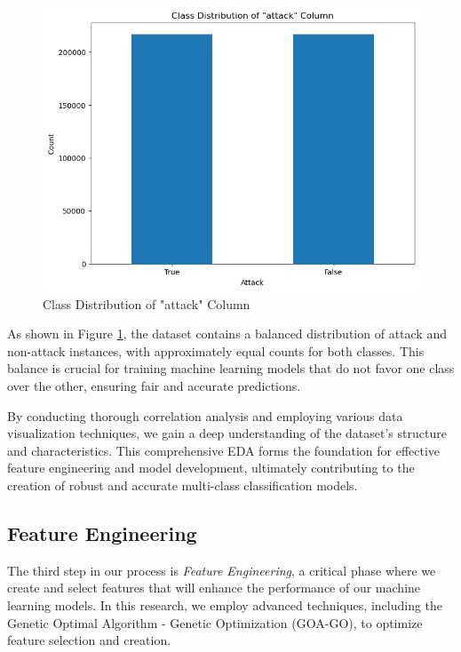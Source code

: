 \begin{figure}[H]
    \centering
    \includegraphics[width=1\linewidth]{Chap3//images/datavisualisation.png}
     \caption{Class Distribution of "attack" Column}
    \label{fig:class-distribution}
\end{figure}

As shown in Figure \ref{fig:class-distribution}, the dataset contains a balanced distribution of attack and non-attack instances, with approximately equal counts for both classes. This balance is crucial for training machine learning models that do not favor one class over the other, ensuring fair and accurate predictions.

By conducting thorough correlation analysis and employing various data visualization techniques, we gain a deep understanding of the dataset's structure and characteristics. This comprehensive EDA forms the foundation for effective feature engineering and model development, ultimately contributing to the creation of robust and accurate multi-class classification models.



\subsection{Feature Engineering}

The third step in our process is \textit{Feature Engineering}, a critical phase where we create and select features that will enhance the performance of our machine learning models. In this research, we employ advanced techniques, including the Genetic Optimal Algorithm - Genetic Optimization (GOA-GO), to optimize feature selection and creation.

